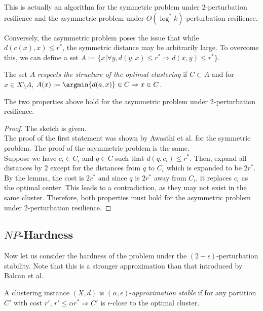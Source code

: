 \begin{remark}
This is actually an algorithm for the symmetric problem under $2$-perturbation resilience and the asymmetric problem under $O(\log^*k)$-perturbation resilience.
\end{remark}

Conversely, the asymmetric problem poses the issue that while $d(c(x),x)\leq r^*$, the symmetric distance may be arbitrarily large. To overcome this, we can define a set $A:=\{x|\forall y,d(y,x)\leq r^*\Rightarrow d(x,y)\leq r^*\}$.

\begin{definition}
The set $A$ \emph{respects the structure of the optimal clustering} if $C\subset A$ and for $x\in X\setminus A$, $A(x):=\argmin{d(a,x)}\in C\Rightarrow x\in C$.
\end{definition}

\begin{lemma}
The two properties above hold for the asymmetric problem under 2-perturbation resilience.
\end{lemma}

\begin{proof}
The sketch is given.\\

The proof of the first statement was shown by Awasthi et al. for the symmetric problem. The proof of the asymmetric problem is the same.\\

Suppose we have $c_i\in C_i$ and $q\in C$ such that $d(q,c_i)\leq r^*$. Then, expand all distances by 2 except for the distances from $q$ to $C_i$ which is expanded to be $2r^*$. By the lemma, the cost is $2r^*$ and since $q$ is $2r^*$ away from $C_i$, it replaces $c_i$ as the optimal center. This leads to a contradiction, as they may not exist in the same cluster. Therefore, both properties must hold for the asymmetric problem under 2-perturbation resilience.
\end{proof}

\subsection{$NP$-Hardness}

Now let us consider the hardness of the problem under the $(2-\epsilon)$-perturbation stability. Note that this is a stronger approximation than that introduced by Balcan et al.

\begin{definition}
A clustering instance $(X,d)$ is $(\alpha,\epsilon)$-\emph{approximation stable} if for any partition $C'$ with cost $r'$, $r'\leq\alpha r^*\Rightarrow C'$ is $\epsilon$-close to the optimal cluster.
\end{definition}

